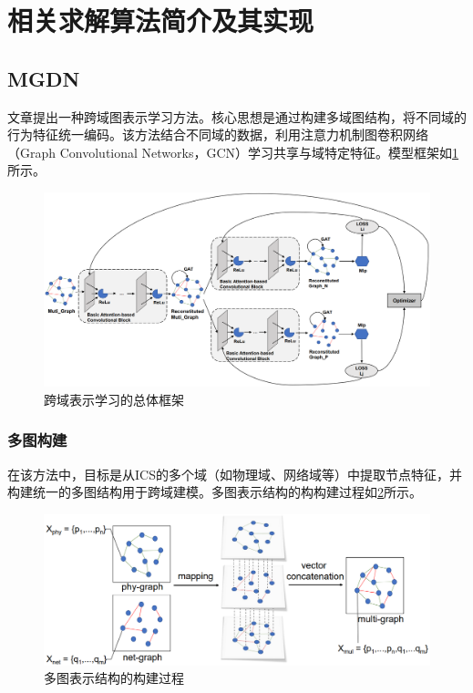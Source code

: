 \section{相关求解算法简介及其实现}

\subsection{MGDN}

文章提出一种跨域图表示学习方法。核心思想是通过构建多域图结构，将不同域的行为特征统一编码。该方法结合不同域的数据，利用注意力机制图卷积网络（Graph Convolutional Networks，GCN）学习共享与域特定特征。模型框架如\cref{figure:跨域表示学习的总体框架}所示。

\begin{figure}[ht]
    \centering
    \includegraphics[width=1\textwidth]{img/跨域表示学习的总体框架.png}
    \caption{跨域表示学习的总体框架}
    \label{figure:跨域表示学习的总体框架}
\end{figure}

\subsubsection{多图构建}

在该方法中，目标是从ICS的多个域（如物理域、网络域等）中提取节点特征，并构建统一的多图结构用于跨域建模。多图表示结构的构构建过程如\cref{figure:多图表示结构的构建过程}所示。

\begin{figure}[ht]
    \centering
    \includegraphics[width=1\textwidth]{img/多图表示结构的构建过程.png}
    \caption{多图表示结构的构建过程}
    \label{figure:多图表示结构的构建过程}
\end{figure}

